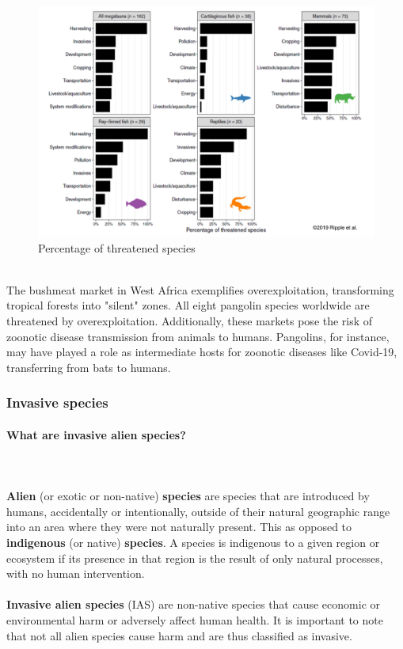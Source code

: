 \documentclass[../summary.tex]{subfiles}
\begin{document}
\begin{figure}[H]
	\centering
	\includegraphics[width=0.65\linewidth]{../images/Share_of_overharvesting}
	\caption{Percentage of threatened species}
	\label{fig:shareofoverharvesting}
\end{figure}


\ \\
The bushmeat market in West Africa exemplifies overexploitation, transforming tropical forests into "silent" zones. All eight pangolin species worldwide are threatened by overexploitation. Additionally, these markets pose the risk of zoonotic disease transmission from animals to humans. Pangolins, for instance, may have played a role as intermediate hosts for zoonotic diseases like Covid-19, transferring from bats to humans.

\subsubsection{Invasive species}
\paragraph{What are invasive alien species?}
\ \\\\
\textbf{Alien} (or exotic or non-native) \textbf{species} are species that are introduced by humans, accidentally or intentionally, outside of their natural geographic range into an area where they were not naturally present. This as opposed to \textbf{indigenous} (or native) \textbf{species}. A species is indigenous to a given region or ecosystem if its presence in that region is the result of only natural processes, with no human intervention. \\
\\
\textbf{Invasive alien species} (IAS) are non-native species that cause economic or environmental harm or adversely affect human health. It is important to note that not all alien species cause harm and are thus classified as invasive. 
\end{document}
